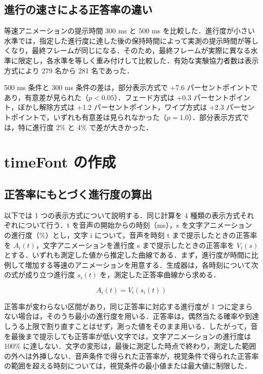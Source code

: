 \subsection{進行の速さによる正答率の違い}

等速アニメーションの提示時間 300 ms と 500 ms を比較した．進行度が小さい水準では，指定した進行度に達した後の保持時間によって実測の提示時間が等しくなり，最終フレームが同じになる．そのため，最終フレームが実際に異なる水準に限定し，各水準を等しく重み付けして比較した．有効な実験協力者数は表示方式により 279 名から 281 名であった．

500 ms 条件と 300 ms 条件の差は，部分表示方式で +7.6 パーセントポイントであり，有意差が見られた（$p < 0.05$）．フェード方式は +0.3 パーセントポイント，ぼかし解除方式は +1.2 パーセントポイント，ワイプ方式は +2.3 パーセントポイントで，いずれも有意差は見られなかった（$p = 1.0$）．部分表示方式では，特に進行度 2\% と 4\% で差が大きかった．


\section{timeFont の作成}


\subsection{正答率にもとづく進行度の算出}

以下では 1 つの表示方式について説明する．同じ計算を 4 種類の表示方式それぞれについて行う．t を音声の開始からの時刻（ms），s を文字アニメーションの進行度（\%）とし，文字 i について，音声を時刻 t まで提示したときの正答率を $A_i(t)$，文字アニメーションを進行度 s まで提示したときの正答率を $V_i(s)$ とする．いずれも測定した値から推定した曲線である．まず，進行度が時間に比例して増加する等速のアニメーションを用意する．生成器は，各時刻について次の式が成り立つ進行度 $s_i(t)$ を，測定した正答率曲線から求める．

\begin{equation}
A_i(t) = V_i(s_i(t))
\end{equation}

正答率が変わらない区間があり，同じ正答率に対応する進行度が 1 つに定まらない場合は，そのうち最小の進行度を用いる．正答率は，偶然当たる確率や到達しうる上限で割り直すことはせず，測った値をそのまま用いる．したがって，音を最後まで提示しても正答率が低い文字では，文字アニメーションの進行度は 100\% に達しない．文字の変形は，最後に測定した時点で終わり，測定した範囲の外へは外挿しない．音声条件で得られた正答率が，視覚条件で得られた正答率の範囲を超える時刻については，視覚条件の最小値または最大値に制限した．

